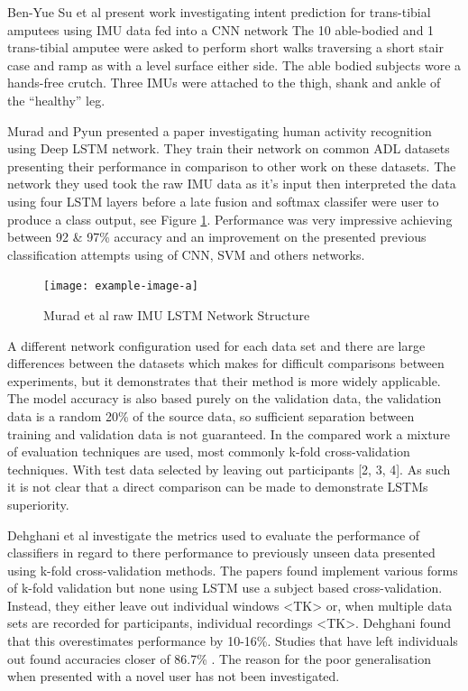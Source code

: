 \documentclass[sensors,article,submit,moreauthors,pdftex]{Definitions/mdpi}
\begin{document}
Ben-Yue Su et al present work investigating intent prediction for trans-tibial amputees using IMU data fed into a CNN network\cite{Su2019} The 10 able-bodied and 1 trans-tibial amputee were asked to perform short walks traversing a short stair case and ramp as with a level surface either side. The able bodied subjects wore a hands-free crutch. Three IMUs were attached to the thigh, shank and ankle of the “healthy” leg.

Murad and Pyun presented a paper investigating human activity recognition using Deep LSTM network\cite{Murad2017}. They train their network on common ADL datasets presenting their performance in comparison to other work on these datasets. The network they used took the raw IMU data as it's input then interpreted the data using four LSTM layers before a late fusion and softmax classifer were user to produce a class output, see Figure \ref{fig:murad_lst_network_structure}. Performance was very impressive achieving between 92 \& 97\% accuracy and an improvement on the presented previous classification attempts using of CNN, SVM and others networks.

\begin{figure}[!htb]
    \centering
    \texttt{[image: example-image-a]}
    \caption{Murad et al raw IMU LSTM Network Structure}
    \label{fig:murad_lst_network_structure}
\end{figure}

A different network configuration used for each data set and there are large differences between the datasets which makes for difficult comparisons between experiments, but it demonstrates that their method is more widely applicable. The model accuracy is also based purely on the validation data, the validation data is a random 20\% of the source data, so sufficient separation between training and validation data is not guaranteed. In the compared work a mixture of evaluation techniques are used, most commonly k-fold cross-validation techniques. With test data selected by leaving out participants [2, 3, 4]. As such it is not clear that a direct comparison can be made to demonstrate LSTMs superiority.

Dehghani et al investigate the metrics used to evaluate the performance of classifiers in regard to there performance to previously unseen data presented using k-fold cross-validation methods\cite{Dehghani2019}. The papers found implement various forms of k-fold validation but none using LSTM use a subject based cross-validation. Instead, they either leave out individual windows \cite{Murad2017, Wang2020}<TK> or, when multiple data sets are recorded for participants, individual recordings \cite{Ordonez2016}<TK>. Dehghani found that this overestimates performance by 10-16\%. Studies that have left individuals out found accuracies closer of 86.7\% \cite{Zhao2018}. The reason for the poor generalisation when presented with a novel user has not been investigated.
\end{document}
